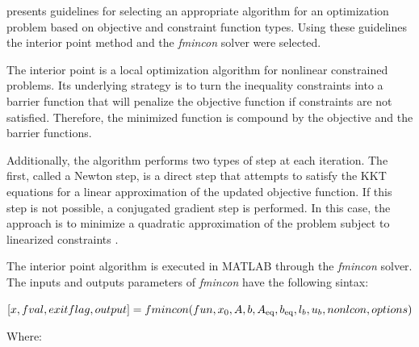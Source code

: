  presents guidelines for selecting an appropriate algorithm for an optimization problem based on objective and constraint function types. Using these guidelines the interior point method and the \textit{fmincon} solver were selected.

The interior point is a local optimization algorithm for nonlinear constrained problems. Its underlying strategy is to turn the inequality constraints into a barrier function that will penalize the objective function if constraints are not satisfied. Therefore, the minimized function is compound by the objective and the barrier functions. 

Additionally, the algorithm performs two types of step at each iteration. The first, called a Newton step, is a direct step that attempts to satisfy the KKT equations for a linear approximation of the updated objective function. If this step is not possible, a conjugated gradient step is performed. In this case, the approach is to minimize a quadratic approximation of the problem subject to linearized constraints \cite{OptToolbox}. 

The interior point algorithm is executed in MATLAB through the \textit{fmincon} solver. The inputs and outputs parameters of \textit{fmincon} have the following sintax:

\begin{math}
\newline
\centering
[x,fval,exitflag,output] = fmincon(fun,x_0,A,b,A\textsubscript{eq},b\textsubscript{eq},l_b,u_b,nonlcon,options)
\newline
\end{math}

Where:

